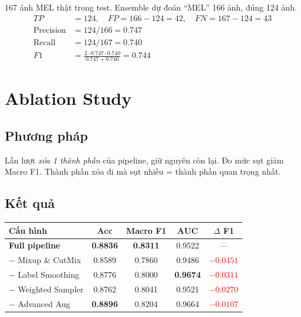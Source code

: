 \documentclass[11pt,a4paper]{article}
\begin{document}
\begin{example}
167 ảnh MEL thật trong test. Ensemble dự đoán ``MEL'' 166 ảnh, đúng 124 ảnh.
\begin{align*}
TP &= 124, \quad FP = 166-124 = 42, \quad FN = 167-124 = 43\\
\mathrm{Precision} &= 124/166 = 0.747\\
\mathrm{Recall} &= 124/167 = 0.740\\
F1 &= \frac{2 \cdot 0.747 \cdot 0.740}{0.747 + 0.740} = \mathbf{0.744}
\end{align*}
\end{example}

\section{Ablation Study}

\subsection{Phương pháp}

\begin{simple}
Lần lượt \textit{xóa 1 thành phần} của pipeline, giữ nguyên còn lại. Đo mức sụt giảm Macro F1. Thành phần xóa đi mà sụt nhiều = thành phần quan trọng nhất.
\end{simple}

\subsection{Kết quả}

\begin{table}[h]
\centering\small
\begin{tabular}{lcccc}
\toprule
\textbf{Cấu hình} & \textbf{Acc} & \textbf{Macro F1} & \textbf{AUC} & \textbf{$\Delta$ F1} \\
\midrule
\textbf{Full pipeline} & \textbf{0.8836} & \textbf{0.8311} & 0.9522 & --- \\
\midrule
$-$ Mixup \& CutMix     & 0.8589 & 0.7860 & 0.9486 & \textcolor{red}{$\mathbf{-0.0451}$} \\
$-$ Label Smoothing     & 0.8776 & 0.8000 & \textbf{0.9674} & \textcolor{red}{$-0.0311$} \\
$-$ Weighted Sampler    & 0.8762 & 0.8041 & 0.9521 & \textcolor{red}{$-0.0270$} \\
$-$ Advanced Aug        & \textbf{0.8896} & 0.8204 & 0.9664 & \textcolor{red}{$-0.0107$} \\
\bottomrule
\end{tabular}
\end{table}
\end{document}
